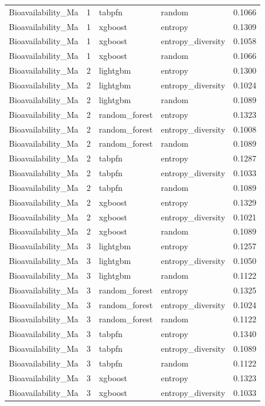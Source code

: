\begin{tabular}{lrllr}
Bioavailability_Ma & 1 & tabpfn & random & 0.1066 \\
Bioavailability_Ma & 1 & xgboost & entropy & 0.1309 \\
Bioavailability_Ma & 1 & xgboost & entropy_diversity & 0.1058 \\
Bioavailability_Ma & 1 & xgboost & random & 0.1066 \\
Bioavailability_Ma & 2 & lightgbm & entropy & 0.1300 \\
Bioavailability_Ma & 2 & lightgbm & entropy_diversity & 0.1024 \\
Bioavailability_Ma & 2 & lightgbm & random & 0.1089 \\
Bioavailability_Ma & 2 & random_forest & entropy & 0.1323 \\
Bioavailability_Ma & 2 & random_forest & entropy_diversity & 0.1008 \\
Bioavailability_Ma & 2 & random_forest & random & 0.1089 \\
Bioavailability_Ma & 2 & tabpfn & entropy & 0.1287 \\
Bioavailability_Ma & 2 & tabpfn & entropy_diversity & 0.1033 \\
Bioavailability_Ma & 2 & tabpfn & random & 0.1089 \\
Bioavailability_Ma & 2 & xgboost & entropy & 0.1329 \\
Bioavailability_Ma & 2 & xgboost & entropy_diversity & 0.1021 \\
Bioavailability_Ma & 2 & xgboost & random & 0.1089 \\
Bioavailability_Ma & 3 & lightgbm & entropy & 0.1257 \\
Bioavailability_Ma & 3 & lightgbm & entropy_diversity & 0.1050 \\
Bioavailability_Ma & 3 & lightgbm & random & 0.1122 \\
Bioavailability_Ma & 3 & random_forest & entropy & 0.1325 \\
Bioavailability_Ma & 3 & random_forest & entropy_diversity & 0.1024 \\
Bioavailability_Ma & 3 & random_forest & random & 0.1122 \\
Bioavailability_Ma & 3 & tabpfn & entropy & 0.1340 \\
Bioavailability_Ma & 3 & tabpfn & entropy_diversity & 0.1089 \\
Bioavailability_Ma & 3 & tabpfn & random & 0.1122 \\
Bioavailability_Ma & 3 & xgboost & entropy & 0.1323 \\
Bioavailability_Ma & 3 & xgboost & entropy_diversity & 0.1033 \\

\end{tabular}
